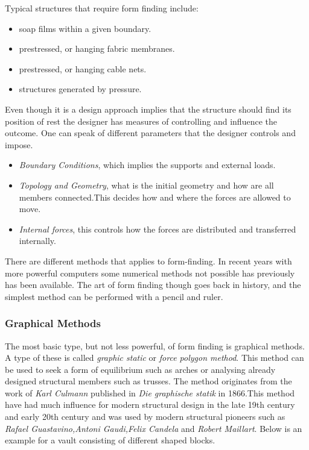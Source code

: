Typical structures that require form finding include:

\begin{itemize}
\item soap films within a given boundary.
\item prestressed, or hanging fabric membranes.
\item prestressed, or hanging cable nets.
\item structures generated by pressure.
\end{itemize}

Even though it is a design approach implies that the structure should find its position of rest the designer has measures of controlling and influence the outcome. One can speak of different parameters that the designer controls and impose.\cite{ref:ShellOpt} 

\begin{itemize}
\item \textit{Boundary Conditions}, which implies the supports and external loads.
\item \textit{Topology and Geometry}, what is the initial geometry and how are all members connected.This decides how and where the forces are allowed to move.
\item \textit{Internal forces}, this controls how the forces are distributed and transferred internally. 
\end{itemize}

There are different methods that applies to form-finding. In recent years with more powerful computers some numerical methods not possible has previously has been available. The art of form finding though goes back in history, and the simplest method can be performed with a pencil and ruler. 

\subsubsection{Graphical Methods}

The most basic type, but not less powerful, of form finding is graphical methods. A type of these is called \textit{graphic static} or \textit{force polygon method}. This method can be used to seek a form of equilibrium such as arches or analysing already designed structural members such as trusses. The method originates from the work of \textit{Karl Culmann} published in \textit{Die graphische statik} in 1866.This method have had much influence for modern structural design in the late 19th century and early 20th century and was used by modern structural pioneers such as \textit{Rafael Guastavino,Antoni Gaudi,Felix Candela} and \textit{Robert Maillart}. \cite{ref:Form} Below is an example for a vault consisting of different shaped blocks.

